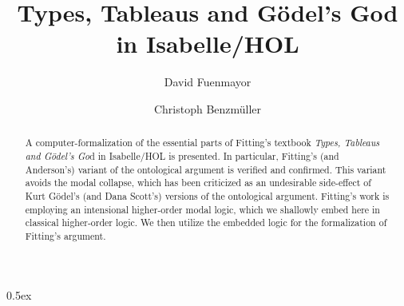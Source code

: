 \documentclass[11pt,a4paper]{article}
\begin{document}
\title{Types, Tableaus and G\"odel's God \\ in Isabelle/HOL}
\author[1]{David Fuenmayor}
\author[2,1]{Christoph Benzm\"uller}

\maketitle

\begin{abstract}
	A computer-formalization of the essential parts of Fitting's textbook
	\emph{Types, Tableaus and G\"odel's Go}d in Isabelle/HOL is
	presented. In particular, Fitting's (and Anderson's) variant of the ontological
	argument is verified and confirmed. This variant avoids the modal
	collapse, which has been criticized as an undesirable side-effect of Kurt G\"odel's (and
	Dana Scott's) versions of the ontological argument. Fitting's work
	is employing an intensional higher-order modal logic, which we
	shallowly embed here in classical higher-order logic. We then
	utilize the embedded logic for the formalization of Fitting's argument.
\end{abstract}


\parindent 0pt\parskip 0.5ex





\end{document}
